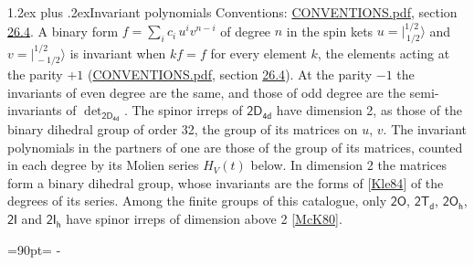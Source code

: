 \documentclass[10pt,a4paper]{article}
\makeatletter
\renewcommand\section{\@startsection{section}{1}{\z@}{-3ex plus -1ex minus -.2ex}%
  {1.2ex plus .2ex}{\normalfont\large\sffamily\bfseries\color{parttitle}}}
\newcommand{\needspace}[1]{\par\penalty-100\begingroup\dimen0=#1\relax\dimen2=\pagegoal
  \advance\dimen2-\pagetotal\ifdim\dimen0>\dimen2\relax\ifdim\dimen2>0pt\vfil\break\fi\fi
  \endgroup}
\numberwithin{equation}{section}
\newcommand{\grp}[1]{\mathsf{#1}}
\newcommand{\jm}[2]{\bigl\lvert{}^{#1}_{\,#2}\bigr\rangle}
\makeatother
\begin{document}
\section{Invariant polynomials}\label{s:invariants}
Conventions: \href{../../CONVENTIONS.pdf}{CONVENTIONS.pdf}, section \href{../../CONVENTIONS.pdf\#conv.26.4}{26.4}.
\leavevmode\label{n:local.binary.form}A binary form $f = \sum_i c_i\, u^i v^{n-i}$ of degree $n$ in the spin kets $u = \jm{1/2}{1/2}$ and $v = \jm{1/2}{-1/2}$ is invariant when $k f = f$ for every element $k$, the elements acting at the parity $+1$ (\href{../../CONVENTIONS.pdf}{CONVENTIONS.pdf}, section \href{../../CONVENTIONS.pdf\#conv.26.4}{26.4}). At the parity $-1$ the invariants of even degree are the same, and those of odd degree are the semi-invariants of $\det_{\grp{2D_{4d}}}$.
The spinor irreps of $\grp{2D_{4d}}$ have dimension 2, as those of the binary dihedral group of order 32, the group of its matrices on $u$, $v$. \label{n:function.hilbert}The invariant polynomials in the partners of one are those of the group of its matrices, counted in each degree by its Molien series $H_V(t)$ below. In dimension 2 the matrices form a binary dihedral group, whose invariants are the forms of [\href{../../../REFERENCES.pdf\#ref.Kle84}{Kle84}] of the degrees of its series. Among the finite groups of this catalogue, only $\grp{2O}$, $\grp{2T_{d}}$, $\grp{2O_{h}}$, $\grp{2I}$ and $\grp{2I_{h}}$ have spinor irreps of dimension above 2 [\href{../../../REFERENCES.pdf\#ref.McK80}{McK80}].
\needspace{90pt}
\end{document}
